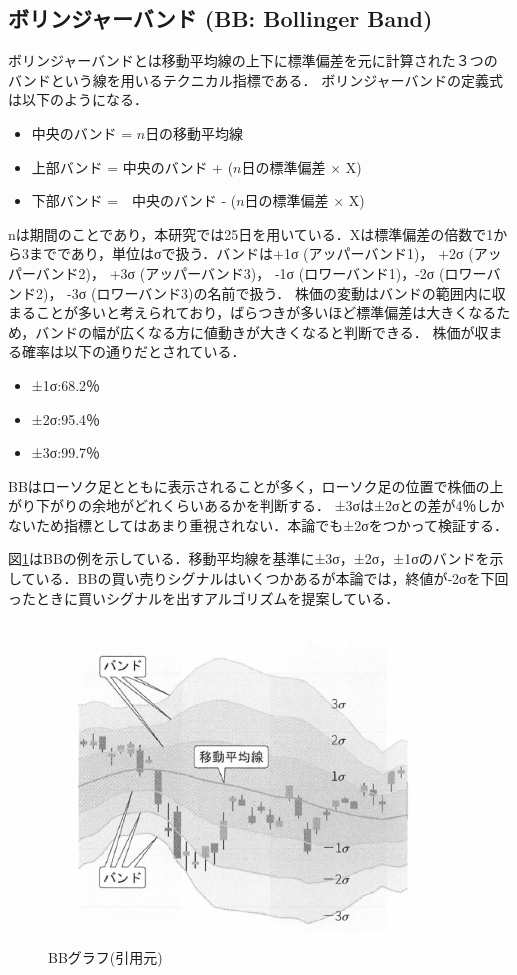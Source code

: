 \subsection{ボリンジャーバンド (BB: Bollinger Band)}
ボリンジャーバンド\cite{pythontrading}とは移動平均線の上下に標準偏差を元に計算された３つのバンドという線を用いるテクニカル指標である．
ボリンジャーバンドの定義式は以下のようになる．
\begin{itemize}
  \item 中央のバンド = $n$日の移動平均線
  \item 上部バンド = 中央のバンド + ($n$日の標準偏差 × X)
  \item 下部バンド =　中央のバンド - ($n$日の標準偏差 × X)
\end{itemize}
nは期間のことであり，本研究では25日を用いている．Xは標準偏差の倍数で1から3までであり，単位はσで扱う．バンドは+1σ (アッパーバンド1)， +2σ (アッパーバンド2)， +3σ (アッパーバンド3)，
-1σ (ロワーバンド1)，-2σ (ロワーバンド2)， -3σ (ロワーバンド3)の名前で扱う．
株価の変動はバンドの範囲内に収まることが多いと考えられており，ばらつきが多いほど標準偏差は大きくなるため，バンドの幅が広くなる方に値動きが大きくなると判断できる．
株価が収まる確率は以下の通りだとされている\cite{pythontrading}．
\begin{itemize}
  \item ±1σ:68.2％
  \item ±2σ:95.4％
  \item ±3σ:99.7％
\end{itemize}
BBはローソク足とともに表示されることが多く，ローソク足の位置で株価の上がり下がりの余地がどれくらいあるかを判断する．
±3σは±2σとの差が4％しかないため指標としてはあまり重視されない．本論でも±2σをつかって検証する．

図\ref{fig:bbex}はBBの例を示している．移動平均線を基準に±3σ，±2σ，±1σのバンドを示している．BBの買い売りシグナルはいくつかあるが本論では，終値が‐2σを下回ったときに買いシグナルを出すアルゴリズムを提案している．

\begin{figure}[H]
  \centering
  \includegraphics[width=110mm]{fig/bbexp.png}
  \caption{BBグラフ(引用元\cite{pythontrading})}
  \label{fig:bbex}
 \end{figure}
